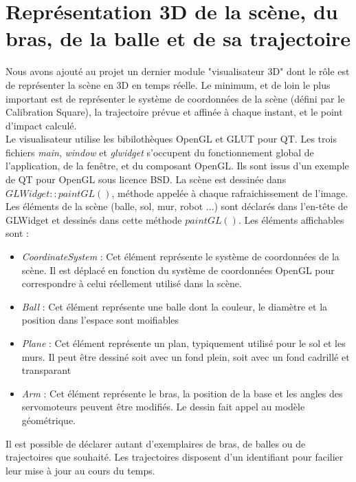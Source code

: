 \documentclass{article}[11pt]
\begin{document}
\section{Représentation 3D de la scène, du bras, de la balle et de sa trajectoire}

Nous avons ajouté au projet un dernier module "visualisateur 3D" dont le rôle est de représenter la scène en 3D en temps réelle. Le minimum, et de loin le plus important est de représenter le système de coordonnées de la scène (défini par le Calibration Square), la trajectoire prévue et affinée à chaque instant, et le point d'impact calculé. \\

Le visualisateur utilise les bibilothèques OpenGL et GLUT pour QT. Les trois fichiers \textit{main}, \textit{window} et \textit{glwidget} s'occupent du fonctionnement global de l'application, de la fenêtre, et du composant OpenGL. Ils sont issus d'un exemple de QT pour OpenGL sous licence BSD. La scène est dessinée dans $GLWidget::paintGL()$, méthode appelée à chaque rafraichissement de l'image. Les éléments de la scène (balle, sol, mur, robot ...) sont déclarés dans l'en-tête de GLWidget et dessinés dans cette méthode $paintGL()$. Les éléments affichables sont :\\


\begin{itemize}
\item \textit{CoordinateSystem} : Cet élément représente le système de coordonnées de la scène. Il est déplacé en fonction du système de coordonnées OpenGL pour correspondre à celui réellement utilisé dans la scène.
\item \textit{Ball} : Cet élément représente une balle dont la couleur, le diamètre et la position dans l'espace sont moifiables
\item \textit{Plane} : Cet élément représente un plan, typiquement utilisé pour le sol et les murs. Il peut être dessiné soit avec un fond plein, soit avec un fond cadrillé et transparant
\item \textit{Arm} : Cet élément représente le bras, la position de la base et les angles des servomoteurs peuvent être modifiés. Le dessin fait appel au modèle géométrique. \\
\end{itemize}

Il est possible de déclarer autant d'exemplaires de bras, de balles ou de trajectoires que souhaité. Les trajectoires disposent d'un identifiant pour facilier leur mise à jour au cours du temps. \\
\end{document}
